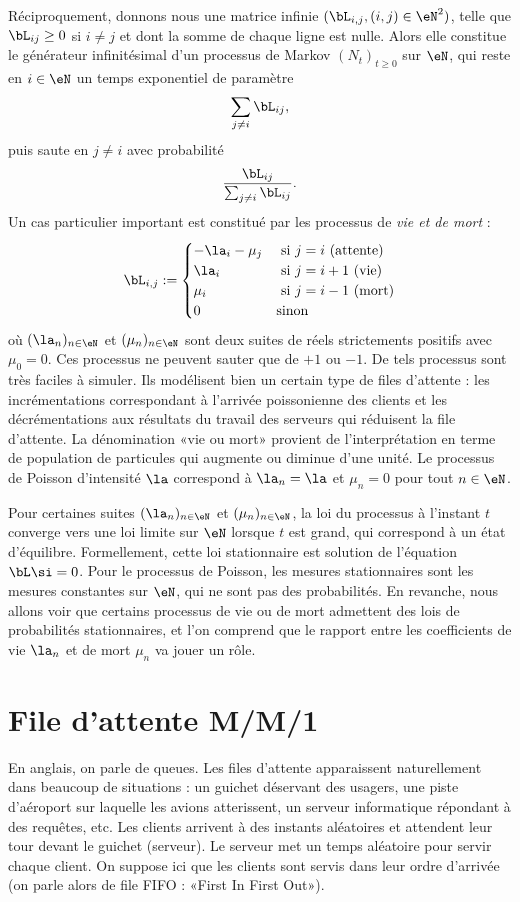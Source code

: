 {{Réciproquement, donnons nous une matrice infinie $(\bL_{i,j},(i,j)\in\eN^2)$,
telle que $\bL_{ij}\geq 0$ si $i\neq j$ et dont la somme de chaque ligne est
nulle. Alors elle constitue le générateur infinitésimal d'un processus de
Markov $(N_t)_{t\geq 0}$ sur $\eN$, qui reste en $i\in\eN$ un temps
exponentiel de paramètre
$$
\sum_{j\neq i}\bL_{ij},
$$
puis saute en $j\neq i$ avec probabilité
$$
\frac{\bL_{ij}}{\sum_{j\neq i}\bL_{ij}}.
$$
Un cas particulier important est constitué par les processus de \emph{vie
  et de mort} :
$$
\bL_{i,j}:=
\begin{cases}
  -\la_{i}-\mu_j & \text{ si $j=i$ (attente)} \\
  \la_{i} & \text{ si $j=i+1$ (vie)} \\
  \mu_{i} & \text{ si $j=i-1$ (mort)} \\
  0 & \text{sinon}
\end{cases}
$$
où $(\la_n)_{n\in\eN}$ et $(\mu_n)_{n\in\eN}$ sont deux suites de réels
strictements positifs avec $\mu_0=0$. Ces processus ne peuvent sauter que de
$+1$ ou $-1$. De tels processus sont très faciles à simuler. Ils modélisent
bien un certain type de files d'attente : les incrémentations correspondant à
l'arrivée poissonienne des clients et les décrémentations aux résultats du
travail des serveurs qui réduisent la file d'attente.  La dénomination «vie ou
mort» provient de l'interprétation en terme de population de particules qui
augmente ou diminue d'une unité. Le processus de Poisson d'intensité $\la$
correspond à $\la_n=\la$ et $\mu_n=0$ pour tout $n\in\eN$.

Pour certaines suites $(\la_n)_{n\in\eN}$ et $(\mu_n)_{n\in\eN}$, la loi du
processus à l'instant $t$ converge vers une loi limite sur $\eN$ lorsque $t$
est grand, qui correspond à un état d'équilibre. Formellement, cette loi
stationnaire est solution de l'équation $\bL\si=0$. Pour le processus de
Poisson, les mesures stationnaires sont les mesures constantes sur $\eN$, qui
ne sont pas des probabilités. En revanche, nous allons voir que certains
processus de vie ou de mort admettent des lois de probabilités stationnaires,
et l'on comprend que le rapport entre les coefficients de vie $\la_n$ et de
mort $\mu_n$ va jouer un rôle.

%
\section{File d'attente M/M/1}
%

En anglais, on parle de queues. Les files d'attente apparaissent naturellement
dans beaucoup de situations : un guichet déservant des usagers, une piste
d'aéroport sur laquelle les avions atterissent, un serveur informatique
répondant à des requêtes, etc.  Les clients arrivent à des instants aléatoires
et attendent leur tour devant le guichet (serveur). Le serveur met un temps
aléatoire pour servir chaque client.  On suppose ici que les clients sont
servis dans leur ordre d'arrivée (on parle alors de file FIFO : «First In
First Out»).

}}
